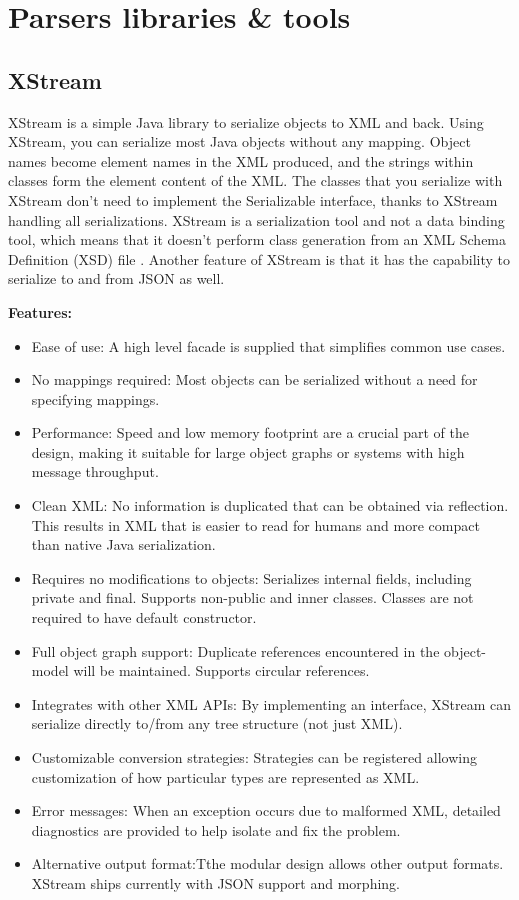 \section{Parsers libraries \& tools}

\subsection{XStream}
XStream is a simple Java library to serialize objects to XML and back. Using XStream, you can serialize most Java objects without any mapping. Object names become element names in the XML produced, and the strings within classes form the element content of the XML.
\newline
\newline
The classes that you serialize with XStream don't need to implement the Serializable interface, thanks to XStream handling all serializations. XStream is a serialization tool and not a data binding tool, which means that it doesn't perform class generation from an XML Schema Definition (XSD) file\cite{bib:xstream} \cite{bib:ibm}.
\newline
\newline
Another feature of XStream is that it has the capability to serialize to and from JSON as well.

\textbf{Features:}
\begin{itemize}
\item{}Ease of use: A high level facade is supplied that simplifies common use cases.
\item{}No mappings required: Most objects can be serialized without a need for specifying mappings.
\item{}Performance: Speed and low memory footprint are a crucial part of the design, making it suitable for large object graphs or systems with high message throughput.
\item{}Clean XML: No information is duplicated that can be obtained via reflection. This results in XML that is easier to read for humans and more compact than native Java serialization.
\item{}Requires no modifications to objects: Serializes internal fields, including private and final. Supports non-public and inner classes. Classes are not required to have default constructor.
\item{}Full object graph support: Duplicate references encountered in the object-model will be maintained. Supports circular references.
\item{}Integrates with other XML APIs: By implementing an interface, XStream can serialize directly to/from any tree structure (not just XML).
\item{}Customizable conversion strategies: Strategies can be registered allowing customization of how particular types are represented as XML.
\item{}Error messages: When an exception occurs due to malformed XML, detailed diagnostics are provided to help isolate and fix the problem.
\item{}Alternative output format:Tthe modular design allows other output formats. XStream ships currently with JSON support and morphing.
\end{itemize}

